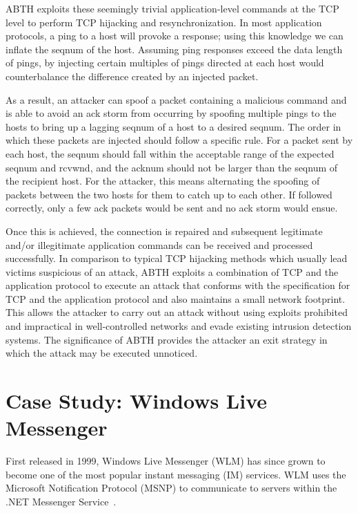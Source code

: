 \documentclass{sig-alternate}
\begin{document}
ABTH exploits these seemingly trivial application-level commands at the TCP level to perform TCP hijacking and resynchronization.
In most application protocols, a ping to a host will provoke a response; using this knowledge we can inflate the seqnum of the host.
Assuming ping responses exceed the data length of pings, by injecting certain multiples of pings directed at each host would counterbalance the difference created by an injected packet.

As a result, an attacker can spoof a packet containing a malicious command and is able to avoid an ack storm from occurring by spoofing multiple pings to the hosts to bring up a lagging seqnum of a host to a desired seqnum. 
The order in which these packets are injected should follow a specific rule.
For a packet sent by each host, the seqnum should fall within the acceptable range of the expected seqnum and rcvwnd, and the acknum should not be larger than the seqnum of the recipient host.
For the attacker, this means alternating the spoofing of packets between the two hosts for them to catch up to each other.
If followed correctly, only a few ack packets would be sent and no ack storm would ensue.

Once this is achieved, the connection is repaired and subsequent legitimate and/or illegitimate application commands can be received and processed successfully.
In comparison to typical TCP hijacking methods which usually lead victims suspicious of an attack, ABTH exploits a combination of TCP and the application protocol to execute an attack that conforms with the specification for TCP and the application protocol and also maintains a small network footprint.
This allows the attacker to carry out an attack without using exploits prohibited and impractical in well-controlled networks and evade existing intrusion detection systems.
The significance of ABTH provides the attacker an exit strategy in which the attack may be executed unnoticed.

\section{Case Study: Windows Live Messenger}
\label{sec:casestudy}

First released in 1999, Windows Live Messenger (WLM) has since grown to become one of the most popular instant messaging (IM) services.
WLM uses the Microsoft Notification Protocol (MSNP) to communicate to servers within the .NET Messenger Service~\cite{piccard:imsecurity}.
\end{document}
